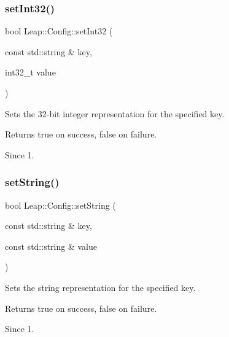 \subsubsection{\texorpdfstring{set\+Int32()}{setInt32()}}
{\footnotesize\ttfamily bool Leap\+::\+Config\+::set\+Int32 (\begin{DoxyParamCaption}\item[{const std\+::string \&}]{key,  }\item[{int32\+\_\+t}]{value }\end{DoxyParamCaption})\hspace{0.3cm}{\ttfamily [inline]}}

Sets the 32-\/bit integer representation for the specified key.


\begin{DoxyCodeInclude}
\end{DoxyCodeInclude}


\begin{DoxyReturn}{Returns}
true on success, false on failure. 
\end{DoxyReturn}
\begin{DoxySince}{Since}
1. 
\end{DoxySince}
\mbox{\label{class_leap_1_1_config_a8daa90073c65525abc477dc8b1b62343}} 
\subsubsection{\texorpdfstring{set\+String()}{setString()}}
{\footnotesize\ttfamily bool Leap\+::\+Config\+::set\+String (\begin{DoxyParamCaption}\item[{const std\+::string \&}]{key,  }\item[{const std\+::string \&}]{value }\end{DoxyParamCaption})\hspace{0.3cm}{\ttfamily [inline]}}

Sets the string representation for the specified key.


\begin{DoxyCodeInclude}
\end{DoxyCodeInclude}


\begin{DoxyReturn}{Returns}
true on success, false on failure. 
\end{DoxyReturn}
\begin{DoxySince}{Since}
1. 
\end{DoxySince}
\mbox{\label{class_leap_1_1_config_a40c2f5140b3addfa75bb9a709ce4b146}} 
